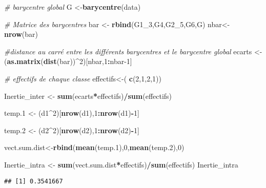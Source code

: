 \documentclass[]{article}
\newenvironment{Shaded}{\begin{snugshade}}{\end{snugshade}}
\newcommand{\CommentTok}[1]{\textcolor[rgb]{0.56,0.35,0.01}{\textit{#1}}}
\newcommand{\DecValTok}[1]{\textcolor[rgb]{0.00,0.00,0.81}{#1}}
\newcommand{\FloatTok}[1]{\textcolor[rgb]{0.00,0.00,0.81}{#1}}
\newcommand{\KeywordTok}[1]{\textcolor[rgb]{0.13,0.29,0.53}{\textbf{#1}}}
\newcommand{\NormalTok}[1]{#1}
\newcommand{\OperatorTok}[1]{\textcolor[rgb]{0.81,0.36,0.00}{\textbf{#1}}}
\newcommand{\StringTok}[1]{\textcolor[rgb]{0.31,0.60,0.02}{#1}}
\begin{document}
\begin{Shaded}
\begin{Highlighting}[]
\CommentTok{# barycentre global}
\NormalTok{G <-}\KeywordTok{barycentre}\NormalTok{(data)}

\CommentTok{# Matrice des barycentres}
\NormalTok{bar <-}\StringTok{ }\KeywordTok{rbind}\NormalTok{(G1_}\DecValTok{3}\NormalTok{,G4,G2_}\DecValTok{5}\NormalTok{,G6,G)}
\NormalTok{nbar<-}\KeywordTok{nrow}\NormalTok{(bar)}

\CommentTok{#distance au carré entre les différents barycentres et le barycentre global}
\NormalTok{ecarts <-(}\KeywordTok{as.matrix}\NormalTok{(}\KeywordTok{dist}\NormalTok{(bar))}\OperatorTok{^}\DecValTok{2}\NormalTok{)[nbar,}\DecValTok{1}\OperatorTok{:}\NormalTok{nbar}\DecValTok{-1}\NormalTok{]}

\CommentTok{# effectifs de chaque classe}
\NormalTok{effectifs<-( }\KeywordTok{c}\NormalTok{(}\DecValTok{2}\NormalTok{,}\DecValTok{1}\NormalTok{,}\DecValTok{2}\NormalTok{,}\DecValTok{1}\NormalTok{))}

\NormalTok{Inertie_inter <-}\StringTok{ }\KeywordTok{sum}\NormalTok{(ecarts}\OperatorTok{*}\NormalTok{effectifs)}\OperatorTok{/}\KeywordTok{sum}\NormalTok{(effectifs)}

\NormalTok{temp}\FloatTok{.1}\NormalTok{ <-}\StringTok{ }\NormalTok{(d1}\OperatorTok{^}\DecValTok{2}\NormalTok{)[}\KeywordTok{nrow}\NormalTok{(d1),}\DecValTok{1}\OperatorTok{:}\KeywordTok{nrow}\NormalTok{(d1)}\OperatorTok{-}\DecValTok{1}\NormalTok{]}

\NormalTok{temp}\FloatTok{.2}\NormalTok{ <-}\StringTok{ }\NormalTok{(d2}\OperatorTok{^}\DecValTok{2}\NormalTok{)[}\KeywordTok{nrow}\NormalTok{(d2),}\DecValTok{1}\OperatorTok{:}\KeywordTok{nrow}\NormalTok{(d2)}\OperatorTok{-}\DecValTok{1}\NormalTok{]}

\NormalTok{vect.sum.dist<-}\KeywordTok{rbind}\NormalTok{(}\KeywordTok{mean}\NormalTok{(temp}\FloatTok{.1}\NormalTok{),}\DecValTok{0}\NormalTok{,}\KeywordTok{mean}\NormalTok{(temp}\FloatTok{.2}\NormalTok{),}\DecValTok{0}\NormalTok{)}

\NormalTok{Inertie_intra <-}\StringTok{ }\KeywordTok{sum}\NormalTok{(vect.sum.dist}\OperatorTok{*}\NormalTok{effectifs)}\OperatorTok{/}\KeywordTok{sum}\NormalTok{(effectifs)}
\NormalTok{Inertie_intra}
\end{Highlighting}
\end{Shaded}

\begin{verbatim}
## [1] 0.3541667
\end{verbatim}
\end{document}

